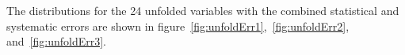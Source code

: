 





The distributions for the 24 unfolded variables with the combined statistical and systematic errors are shown in figure~\ref{fig:unfoldErr1},~\ref{fig:unfoldErr2}, and~\ref{fig:unfoldErr3}.

